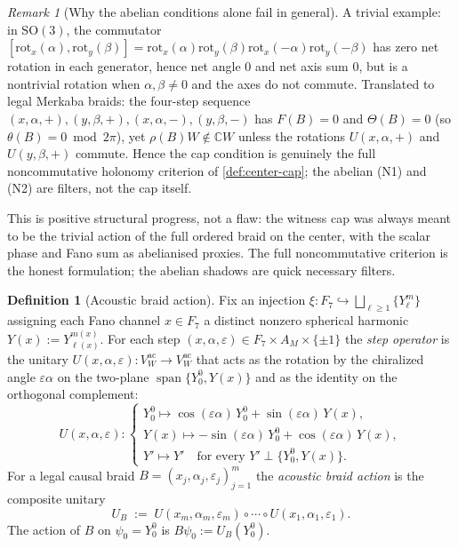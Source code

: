 \documentclass[11pt,a4paper]{article}
\theoremstyle{plain}
\theoremstyle{definition}
\newtheorem{definition}[theorem]{Definition}
\theoremstyle{remark}
\newtheorem{remark}[theorem]{Remark}
\numberwithin{equation}{section}
\newcommand{\Complex}{\mathbb{C}}
\DeclareMathOperator{\spn}{span}
\begin{document}
\medskip

\begin{remark}[Why the abelian conditions alone fail in general]
\label{rmk:noncommutative-cap}
A trivial example: in $\mathrm{SO}(3)$, the commutator
$[\mathrm{rot}_x(\alpha),\mathrm{rot}_y(\beta)]=
\mathrm{rot}_x(\alpha)\mathrm{rot}_y(\beta)\mathrm{rot}_x(-\alpha)
\mathrm{rot}_y(-\beta)$ has zero net rotation in each generator,
hence net angle $0$ and net axis sum $0$, but is a nontrivial
rotation when $\alpha,\beta\ne 0$ and the axes do not commute.
Translated to legal Merkaba braids: the four-step sequence
$(x,\alpha,+),(y,\beta,+),(x,\alpha,-),(y,\beta,-)$ has $F(B)=0$
and $\Theta(B)=0$ (so $\theta(B)=0\bmod 2\pi$), yet
$\rho(B)W\notin\Complex W$ unless the rotations $U(x,\alpha,+)$
and $U(y,\beta,+)$ commute.  Hence the cap condition is
genuinely the full noncommutative holonomy criterion of
\cref{def:center-cap}; the abelian (N1) and (N2) are filters,
not the cap itself.

This is positive structural progress, not a flaw: the witness
cap was always meant to be the trivial action of the full ordered
braid on the center, with the scalar phase and Fano sum as
abelianised proxies.  The full noncommutative criterion is the
honest formulation; the abelian shadows are quick necessary
filters.
\end{remark}

\begin{definition}[Acoustic braid action]
\label{def:acoustic-braid-action}
Fix an injection $\xi\colon F_7\hookrightarrow\bigsqcup_{\ell\ge 1}\{Y_\ell^m\}$ assigning each Fano channel
$x\in F_7$ a distinct nonzero spherical harmonic
$Y(x):=Y_{\ell(x)}^{m(x)}$.  For each step $(x,\alpha,\varepsilon)\in
F_7\times A_M\times\{\pm 1\}$ the \emph{step operator} is the
unitary $U(x,\alpha,\varepsilon)\colon V_W^{\mathrm{ac}}\to
V_W^{\mathrm{ac}}$ that acts as the rotation by the chiralized
angle $\varepsilon\alpha$ on the two-plane
$\spn\{Y_0^0,Y(x)\}$ and as the identity on the orthogonal
complement:
\[
  U(x,\alpha,\varepsilon)\colon
  \begin{cases}
    Y_0^0\mapsto\cos(\varepsilon\alpha)\,Y_0^0
        +\sin(\varepsilon\alpha)\,Y(x),\\
    Y(x)\mapsto-\sin(\varepsilon\alpha)\,Y_0^0
        +\cos(\varepsilon\alpha)\,Y(x),\\
    Y'\mapsto Y'\quad\text{for every $Y'\perp\{Y_0^0,Y(x)\}$.}
  \end{cases}
\]
For a legal causal braid $B=(x_j,\alpha_j,\varepsilon_j)_{j=1}^m$
the \emph{acoustic braid action} is the composite unitary
\[
  U_B\;:=\;U(x_m,\alpha_m,\varepsilon_m)\circ\cdots\circ
            U(x_1,\alpha_1,\varepsilon_1).
\]
The action of $B$ on $\psi_0=Y_0^0$ is $B\psi_0:=U_B(Y_0^0)$.
\end{definition}
\end{document}
